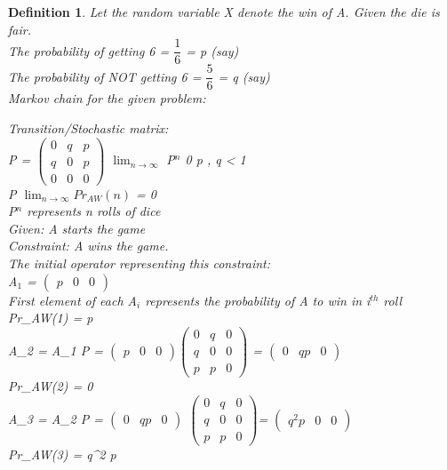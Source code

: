 \documentclass[journal,12pt,twocolumn]{IEEEtran}
\newtheorem{definition}{Definition}[theorem]
\theoremstyle{remark}
\newcommand{\myvec}[1]{\ensuremath{\begin{pmatrix}#1\end{pmatrix}}}
\numberwithin{equation}{subsection}
\begin{document}
\begin{definition}
    Let the random variable X denote the win of A.
    Given the die is fair.\\
    The probability of getting 6 = $\dfrac{1}{6}$ = p (say)\\
    The probability of NOT getting 6 = $\dfrac{5}{6}$ = q (say)\\
    Markov chain for the given problem:
    \begin{center}
    \end{center}
    
\onehalfspacing
Transition/Stochastic matrix:\\
    P = \myvec{
    0 & q & p\\
    q & 0 & p\\
    0 & 0 & 0}
    \implies $\lim_{n \to \infty}$ P$^n$ \xrightarrow{} 0 \because p , q < 1\\
    \implies P 
    \implies $\lim_{n \to \infty}Pr_{AW}(n)$ = 0\\
    P$^n$ represents n rolls of dice\\
    Given: A starts the game\\
    Constraint: A wins the game.\\
    The initial operator representing this constraint:\\
    A$_1$ = \myvec{p & 0 & 0}\\
    First element of each A$_i$ represents the probability of A to win in i$^{th}$ roll\\
    Pr_{AW}(1) = p\\
    A_2 = A_1 P = \myvec{p & 0 & 0}\myvec{0 & q & 0\\ q & 0 & 0\\ p & p & 0}  = \myvec{0 & qp & 0}\\
    \implies  Pr_{AW}(2) = 0\\
    A_3 = A_2 P = \myvec{0 & qp & 0} \myvec{0 & q & 0\\ q & 0 & 0\\ p & p & 0}= \myvec{q^2 p & 0 & 0}\\
    \implies  Pr_{AW}(3) = q^2 p
\end{definition}
\end{document}
